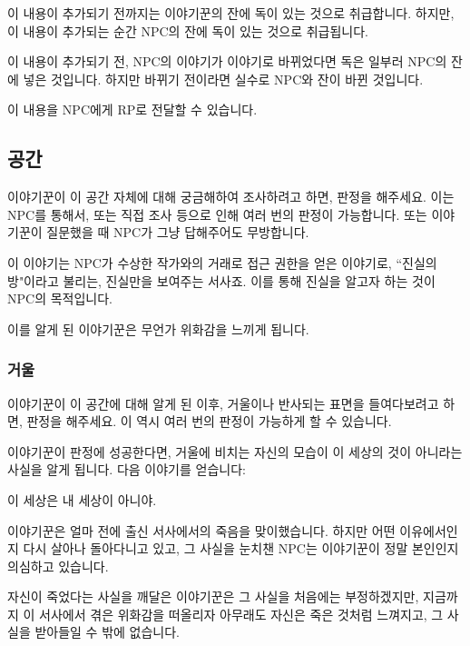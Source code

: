 \documentclass{report}
\begin{document}
	\medskip
	
	이 내용이 추가되기 전까지는 이야기꾼의 잔에 독이 있는 것으로 취급합니다. 하지만, 이 내용이 추가되는 순간 NPC의 잔에 독이 있는 것으로 취급됩니다.
	
	이 내용이 추가되기 전, NPC의  이야기가  이야기로 바뀌었다면 독은 일부러 NPC의 잔에 넣은 것입니다. 하지만 바뀌기 전이라면 실수로 NPC와 잔이 바뀐 것입니다.
	
	이 내용을 NPC에게 RP로 전달할 수 있습니다.
	
	\subsection{공간}
	
	이야기꾼이 이 공간 자체에 대해 궁금해하여 조사하려고 하면, 판정을 해주세요. 이는 NPC를 통해서, 또는 직접 조사 등으로 인해 여러 번의 판정이 가능합니다. 또는 이야기꾼이 질문했을 때 NPC가 그냥 답해주어도 무방합니다.
	
	이 이야기는 NPC가 수상한 작가와의 거래로 접근 권한을 얻은 이야기로, ``진실의 방"이라고 불리는, 진실만을 보여주는 서사죠. 이를 통해 진실을 알고자 하는 것이 NPC의 목적입니다.
	
	이를 알게 된 이야기꾼은 무언가 위화감을 느끼게 됩니다.
	
	\hypertarget{poison:mirror}{}
	\subsubsection{거울}
	
	이야기꾼이 이 공간에 대해 알게 된 이후, 거울이나 반사되는 표면을 들여다보려고 하면, 판정을 해주세요. 이 역시 여러 번의 판정이 가능하게 할 수 있습니다.
	
	이야기꾼이 판정에 성공한다면, 거울에 비치는 자신의 모습이 이 세상의 것이 아니라는 사실을 알게 됩니다. 다음 이야기를 얻습니다:
	
	\begin{lite}{이 세상은 내 세상이 아니야.}
	\end{lite}
	
	이야기꾼은 얼마 전에 출신 서사에서의 죽음을 맞이했습니다. 하지만 어떤 이유에서인지 다시 살아나 돌아다니고 있고, 그 사실을 눈치챈 NPC는 이야기꾼이 정말 본인인지 의심하고 있습니다.
	
	자신이 죽었다는 사실을 깨달은 이야기꾼은 그 사실을 처음에는 부정하겠지만, 지금까지 이 서사에서 겪은 위화감을 떠올리자 아무래도 자신은 죽은 것처럼 느껴지고, 그 사실을 받아들일 수 밖에 없습니다.
	
\end{document}
